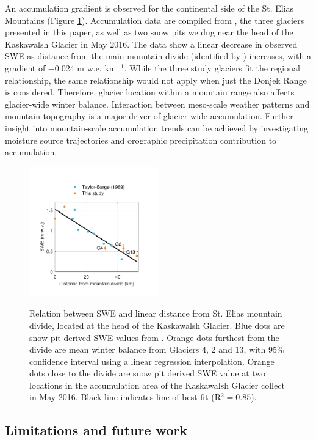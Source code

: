 \documentclass[twocolumn, letterpaper]{igs}
\begin{document}
An accumulation gradient is observed for the continental side of the St. Elias Mountains (Figure \ref{fig:AccumGrad}). Accumulation data are compiled from \cite{Taylor1969}, the three glaciers presented in this paper, as well as two snow pits we dug near the head of the Kaskawalsh Glacier in May 2016. The data show a linear decrease in observed SWE as distance from the main mountain divide (identified by \cite{Taylor1969}) increases, with a gradient of $-0.024$ m w.e. km$^{-1}$. While the three study glaciers fit the regional relationship, the same relationship would not apply when just the Donjek Range is considered. Therefore, glacier location within a mountain range also affects glacier-wide winter balance. Interaction between meso-scale weather patterns and mountain topography is a major driver of glacier-wide accumulation. Further insight into mountain-scale accumulation trends can be achieved by investigating moisture source trajectories and orographic precipitation contribution to accumulation. 

\begin{figure}
	\centering
	\includegraphics[width =0.5\textwidth]{AccumGrad.pdf}\\
	\caption{Relation between SWE and linear distance from St. Elias mountain divide, located at the head of the Kaskawalsh Glacier. Blue dots are snow pit derived SWE values from \cite{Taylor1969}. Orange dots furthest from the divide are mean winter balance from Glaciers 4, 2 and 13, with 95\% confidence interval using a linear regression interpolation. Orange dots close to the divide are snow pit derived SWE value at two locations in the accumulation area of the Kaskawalsh Glacier collect in May 2016. Black line indicates line of best fit (R$^2=0.85$).}
	\label{fig:AccumGrad}
\end{figure}


\subsection{Limitations and future work}
\end{document}
